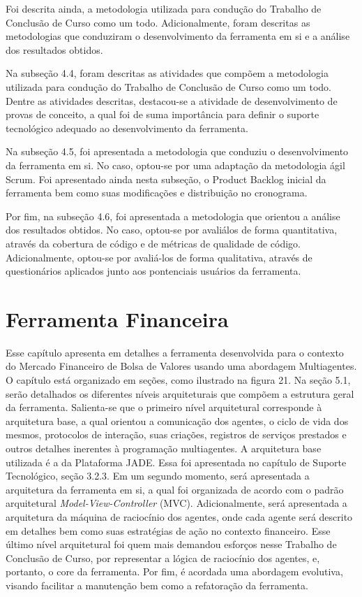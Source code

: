 Foi descrita ainda, a metodologia utilizada para condução do Trabalho de Conclusão de Curso como um todo. Adicionalmente, foram descritas as metodologias que conduziram o desenvolvimento da ferramenta em si e a análise dos resultados obtidos.

Na subseção 4.4, foram descritas as atividades que compõem a metodologia utilizada para condução do Trabalho de Conclusão de Curso como um todo. Dentre as atividades descritas, destacou-se a atividade de desenvolvimento de provas de conceito, a qual foi de suma importância para definir o suporte tecnológico adequado ao desenvolvimento da ferramenta.   

Na subseção 4.5, foi apresentada a metodologia que conduziu o desenvolvimento da ferramenta em si. No caso, optou-se por uma adaptação da metodologia ágil Scrum. Foi apresentado ainda nesta subseção, o Product Backlog inicial da ferramenta bem como suas modificações e distribuição no cronograma.

Por fim, na subseção 4.6, foi apresentada a metodologia que orientou a análise dos resultados obtidos. No caso, optou-se por avaliálos de forma quantitativa, através da cobertura de código e de métricas de qualidade de código. Adicionalmente, optou-se por avaliá-los de forma qualitativa, através de questionários aplicados junto aos pontenciais usuários da ferramenta.


\newpage
\chapter[FERRAMENTA FINANCEIRA]{Ferramenta Financeira}

Esse capítulo apresenta em detalhes a ferramenta desenvolvida para o contexto do Mercado Financeiro de Bolsa de Valores usando uma abordagem Multiagentes. O capítulo está organizado em seções, como ilustrado na figura 21. Na seção 5.1, serão detalhados os diferentes níveis arquiteturais que compõem a estrutura geral da ferramenta. Salienta-se que o primeiro nível arquitetural corresponde à arquitetura base, a qual orientou a comunicação dos agentes, o ciclo de vida dos mesmos, protocolos de interação, suas criações, registros de serviços prestados e outros detalhes inerentes à programação multiagentes. A arquitetura base utilizada é a da Plataforma JADE. Essa foi apresentada no capítulo de Suporte Tecnológico, seção 3.2.3. Em um segundo momento, será apresentada a arquitetura da ferramenta em si, a qual foi organizada de acordo com o padrão arquitetural \textit{Model-View-Controller} (MVC). Adicionalmente, será apresentada a arquitetura da máquina de raciocínio dos agentes, onde cada agente será descrito em detalhes bem como suas estratégias de ação no contexto financeiro. Esse último nível arquitetural foi quem mais demandou esforços nesse Trabalho de Conclusão de Curso, por representar a lógica de raciocínio dos agentes, e, portanto, o core da ferramenta. Por fim, é acordada uma abordagem evolutiva, visando facilitar a manutenção bem como a refatoração da ferramenta.


